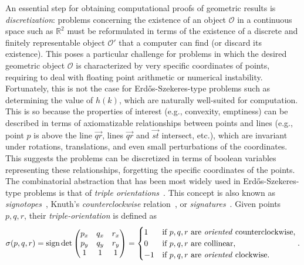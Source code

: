 An essential step for obtaining computational proofs of geometric results is \emph{discretization}: problems concerning the existence of an object $\mathcal{O}$ in a continuous space such as $\mathbb{R}^2$ must be reformulated in terms of the existence of a discrete and finitely representable object $\mathcal{O}'$ that a computer can find (or discard its existence).
This poses a particular challenge for problems in which the desired geometric object $\mathcal{O}$ is characterized by very specific coordinates of points, requiring to deal with floating point arithmetic or numerical instability.
Fortunately, this is not the case for Erd\H{o}s-Szekeres-type problems such as determining the value of $h(k)$, which are naturally well-suited for computation.
This is so because the properties of interest (e.g., convexity, emptiness) can be described in terms of axiomatizable relationships between points and lines (e.g., point $p$ is above the line $\overrightarrow{qr}$, lines $\overrightarrow{qr}$ and $\overrightarrow{st}$ intersect, etc.), which are invariant under rotations, translations, and even small perturbations of the coordinates. This suggests the problems can be discretized in terms of boolean variables representing these relationships, forgetting the specific coordinates of the points.
The combinatorial abstraction that has been most widely used in Erd\H{o}s-Szekeres-type problems is that of \emph{triple orientations}~\cite{ emptyHexagonNumber, scheucherTwoDisjoint5holes2020}. This concept is also known as \emph{signotopes}~\cite{felsnerSweepsArrangementsSignotopes2001,subercaseaux2023minimizing},  Knuth's \emph{counterclockwise} relation~\cite{knuthAxiomsHulls1992}, or \emph{signatures}~\cite{szekeres_peters_2006}.
Given points $p, q, r$, their \emph{triple-orientation} is defined as
\newcommand{\sign}{\operatorname{sign}}
\[
  \sigma(p, q, r) = \sign \det \begin{pmatrix} p_x & q_x & r_x \\ p_y & q_y & r_y \\ 1 & 1 & 1 \end{pmatrix} = \begin{cases}
    1 & \text{if } p, q, r \text{ are \emph{oriented} counterclockwise}, \\
    0 & \text{if } p, q, r \text{ are collinear}, \\
    -1 & \text{if } p, q, r \text{ are \emph{oriented} clockwise}.
  \end{cases}.
\]

